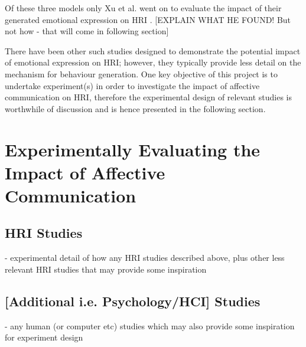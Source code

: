 \documentclass[11pt,a4paper]{report}
\begin{document}
Of these three models only Xu et al. went on to evaluate the impact of their generated emotional expression on HRI \citep{xu2014robot}. [EXPLAIN WHAT HE FOUND! But not how - that will come in following section]

There have been other such studies designed to demonstrate the potential impact of emotional expression on HRI; however, they typically provide less detail on the mechanism for behaviour generation. One key objective of this project is to undertake experiment(s) in order to investigate the impact of affective communication on HRI, therefore the experimental design of relevant studies is worthwhile of discussion and is hence presented in the following section.

\section{Experimentally Evaluating the Impact of Affective Communication}
\subsection{HRI Studies}
- experimental detail of how any HRI studies described above, plus other less relevant HRI studies that may provide some inspiration
\subsection{[Additional i.e. Psychology/HCI] Studies}
- any human (or computer etc) studies which may also provide some inspiration for experiment design


\end{document}
